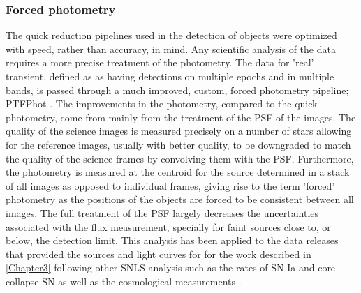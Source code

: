 \subsubsection{Forced photometry}
The quick reduction pipelines used in the detection of objects were optimized with speed, rather than accuracy, in mind. Any scientific analysis of the data requires a more precise treatment of the photometry. The data for 'real' transient, defined as as having detections on multiple epochs and in multiple bands, is passed through a much improved, custom, forced photometry pipeline; PTFPhot \citep{Firth2015}. The improvements in the photometry, compared to the quick photometry, come from mainly from the treatment of the PSF of the images. The quality of the science images is measured precisely on a number of stars allowing for the reference images, usually with better quality, to be downgraded to match the quality of the science frames by convolving them with the PSF. Furthermore, the photometry is measured at the centroid for the source determined in a stack of all images as opposed to individual frames, giving rise to the term 'forced' photometry as the positions of the objects are forced to be consistent between all images. The full treatment of the PSF largely decreases the uncertainties associated with the flux measurement, specially for faint sources close to, or below, the detection limit. This analysis has been applied to the data releases that provided the sources and light curves for for the work described in \cref{Chapter3} following other SNLS analysis such as the rates of SN-Ia \citep{Perrett2012} and core-collapse SN \citep{Bazin2009} as well as the cosmological measurements \citep{Astier2006,Sullivan2011}.

